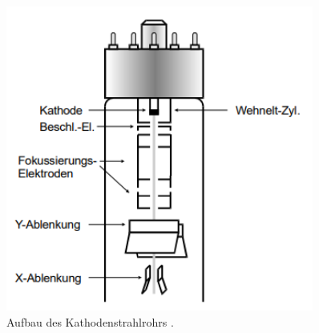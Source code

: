     \begin{figure}
        \centering
        \includegraphics[width=0.9\textwidth]{content/wehnelt.png}
        \caption{Aufbau des Kathodenstrahlrohrs \cite{V501-und-V502}.}
        \label{fig:wehnelt}
    \end{figure}

